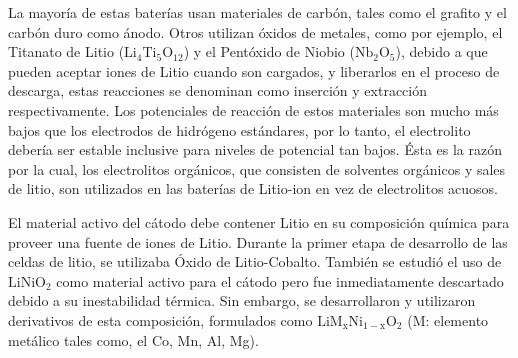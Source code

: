 \documentclass[10pt,a4paper]{article}
\begin{document}
    \noindent La mayoría de estas baterías usan materiales de carbón, 
    tales como el grafito y el carbón duro como ánodo. Otros utilizan óxidos de 
    metales, como por ejemplo, el Titanato de Litio ($\mathrm{Li_4Ti_5O_{12}}$) 
    y el Pentóxido de Niobio ($\mathrm{Nb_2O_5}$), debido a que pueden aceptar 
    iones de Litio cuando son cargados, y liberarlos en el proceso de descarga, 
    estas reacciones se denominan como inserción y extracción respectivamente. 
    Los potenciales de reacción de estos materiales son mucho más bajos que los 
    electrodos de hidrógeno estándares, por lo tanto, el electrolito debería ser 
    estable inclusive para niveles de potencial tan bajos. Ésta es la razón por la 
    cual, los electrolitos orgánicos, que consisten de solventes orgánicos y 
    sales de litio, son utilizados en las baterías de Litio-ion en vez de 
    electrolitos acuosos.

	\noindent El material activo del cátodo debe contener Litio en su composición química 
    para proveer una fuente de iones de Litio. Durante la primer etapa de 
    desarrollo de las celdas de litio, se utilizaba Óxido de Litio-Cobalto.
    También se estudió el uso de $\mathrm{LiNiO_2}$ como 
    material activo para el cátodo pero fue inmediatamente descartado debido a 
    su inestabilidad térmica. Sin embargo, se desarrollaron y utilizaron 
    derivativos de esta composición, formulados como 
    $\mathrm{LiM_xNi_{1-x}O_2}$ (M: elemento metálico tales como, el Co, Mn, 
    Al, Mg).
	
\end{document}
